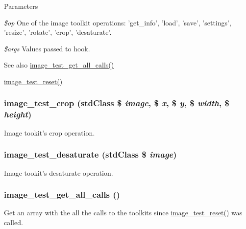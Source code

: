 \begin{DoxyParams}{Parameters}
\item[{\em \$op}]One of the image toolkit operations: 'get\_\-info', 'load', 'save', 'settings', 'resize', 'rotate', 'crop', 'desaturate'. \item[{\em \$args}]Values passed to hook.\end{DoxyParams}
\begin{DoxySeeAlso}{See also}
\hyperlink{image__test_8module_a3f28c9aa17b3a20708dbe6329f1f26f9}{image\_\-test\_\-get\_\-all\_\-calls()} 

\hyperlink{image__test_8module_a30ba1bb2238f38e31212ca0544a0a88c}{image\_\-test\_\-reset()} 
\end{DoxySeeAlso}
\hypertarget{image__test_8module_a245169be5747393a397f119c2fdf9bb7}{
\subsubsection[{image\_\-test\_\-crop}]{\setlength{\rightskip}{0pt plus 5cm}image\_\-test\_\-crop (stdClass \$ {\em image}, \/  \$ {\em x}, \/  \$ {\em y}, \/  \$ {\em width}, \/  \$ {\em height})}}
\label{image__test_8module_a245169be5747393a397f119c2fdf9bb7}
Image tookit's crop operation. \hypertarget{image__test_8module_aad1992f25f15693079e9b804301825cb}{
\subsubsection[{image\_\-test\_\-desaturate}]{\setlength{\rightskip}{0pt plus 5cm}image\_\-test\_\-desaturate (stdClass \$ {\em image})}}
\label{image__test_8module_aad1992f25f15693079e9b804301825cb}
Image tookit's desaturate operation. \hypertarget{image__test_8module_a3f28c9aa17b3a20708dbe6329f1f26f9}{
\subsubsection[{image\_\-test\_\-get\_\-all\_\-calls}]{\setlength{\rightskip}{0pt plus 5cm}image\_\-test\_\-get\_\-all\_\-calls ()}}
\label{image__test_8module_a3f28c9aa17b3a20708dbe6329f1f26f9}
Get an array with the all the calls to the toolkits since \hyperlink{image__test_8module_a30ba1bb2238f38e31212ca0544a0a88c}{image\_\-test\_\-reset()} was called.

